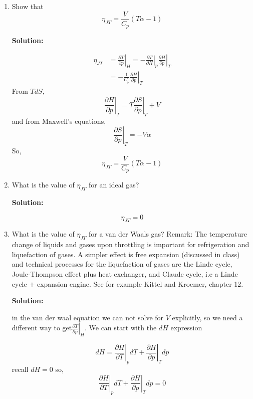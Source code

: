 \documentclass[10pt]{article}
\newenvironment{Solution}
    {\textbf{Solution:}
    
    \vspace{5mm}
    \begin{tcolorbox}
    }
    {
    \end{tcolorbox}
    \vspace{5mm}
    }
\begin{document}
\begin{enumerate}
\begin{enumerate}
\item Show that
$$
\eta_{J T}=\frac{V}{C_{p}}(T \alpha-1)
$$

\begin{Solution}
\begin{align}
    \eta_{JT} &= \left.\frac{\partial T}{\partial p}\right|_H = - \left.\frac{\partial T}{\partial H}\right|_p \left.\frac{\partial H}{\partial p}\right|_T\\
    & = -\frac{1}{C_p} \left.\frac{\partial H}{\partial p}\right|_T
\end{align}
From $TdS$, 
\begin{equation}
    \left.\frac{\partial H}{\partial p}\right|_T = T \left.\frac{\partial S}{\partial p}\right|_T + V
\end{equation}
and from Maxwell's equations, 
\begin{equation}
    \left.\frac{\partial S}{\partial p}\right|_T = -V \alpha
\end{equation}
So,
\begin{equation}
    \boxed{ \eta_{J T}=\frac{V}{C_{p}}(T \alpha-1) }
\end{equation}
\end{Solution}

\item What is the value of $\eta_{J T}$ for an ideal gas?

\begin{Solution}
\begin{equation}
    \eta_{J T}=0
\end{equation}
\end{Solution}

\item What is the value of $\eta_{J T}$ for a van der Waals gas?
Remark: The temperature change of liquids and gases upon throttling is important for refrigeration and liquefaction of gases. A simpler effect is free expansion (discussed in class) and technical processes for the liquefaction of gases are the Linde cycle, Joule-Thompson effect plus heat exchanger, and Claude cycle, i.e a Linde cycle $+$ expansion engine. See for example Kittel and Kroemer, chapter 12.

\begin{Solution}
in the van der waal equation we can not solve for $V$ explicitly, so we need a different way to get$ \left.\frac{\partial T}{\partial p}\right|_{H}$. We can start with the $dH$ expression

\begin{equation}
    dH = \left.\frac{\partial H}{\partial T}\right|_{p}dT +\left.\frac{\partial H}{\partial p}\right|_{T}dp 
\end{equation}
recall $dH=0$ so, 
\begin{equation}
    \left.\frac{\partial H}{\partial T}\right|_{p}dT +\left.\frac{\partial H}{\partial p}\right|_{T}dp = 0
\end{equation}
\end{Solution}
    

\end{enumerate}
\end{enumerate}
\end{document}

